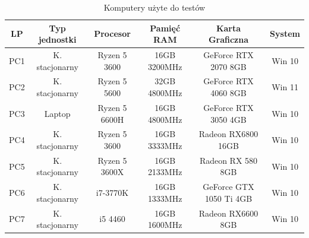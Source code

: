 \documentclass[12pt,twoside]{article}
\begin{document}
\begin{table}[ht]
    \caption{Komputery użyte do testów}
    \centering		
        \begin{tabular}{|c|c|c|c|c|c|}	
            \hline
            LP & Typ jednostki & Procesor & Pamięć RAM & Karta Graficzna & System \\
            \hline
            PC1 & K. stacjonarny & Ryzen 5 3600 & 16GB 3200MHz & GeForce RTX 2070 8GB & Win 10\\
            \hline
            PC2 & K. stacjonarny & Ryzen 5 5600 & 32GB 4800MHz & GeForce RTX 4060 8GB & Win 11 \\
            \hline
            PC3 & Laptop & Ryzen 5 6600H & 16GB 4800MHz & GeForce RTX 3050 4GB & Win 10 \\
            \hline
            PC4 & K. stacjonarny & Ryzen 5 3600 & 16GB 3333MHz & Radeon RX6800 16GB & Win 10\\
            \hline
            PC5 & K. stacjonarny & Ryzen 5 3600X & 16GB 2133MHz & Radeon RX 580 8GB & Win 10\\
            \hline
            PC6 & K. stacjonarny & i7-3770K & 16GB 1333MHz & GeForce GTX 1050 Ti 4GB & Win 10\\
            \hline
            PC7 & K. stacjonarny & i5 4460 & 16GB 1600MHz & Radeon RX6600 8GB & Win 10\\
            \hline

        \end{tabular}	
    \label{Tabela:KomputeryTesty}
\end{table}	
\end{document}
